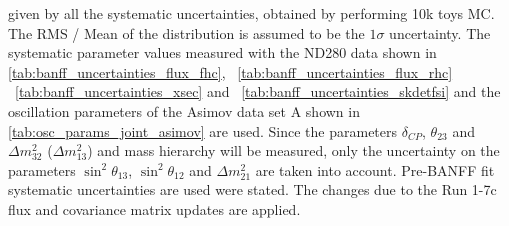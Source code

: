\begin{table}[htb]
{ given by all the systematic uncertainties, obtained by performing 10k toys MC.
The RMS / Mean of the distribution is assumed to be the $1\sigma$ uncertainty.
The systematic parameter values measured with the ND280 data 
shown in 
\cref{tab:banff_uncertainties_flux_fhc},
~\ref{tab:banff_uncertainties_flux_rhc}
~\ref{tab:banff_uncertainties_xsec}
and
~\ref{tab:banff_uncertainties_skdetfsi}
and the oscillation parameters of the Asimov data set A shown in \cref{tab:osc_params_joint_asimov}
are used.
Since the parameters $\delta_{CP}$, $\theta_{23}$ and $\Delta m^2_{32}$ ($\Delta m^2_{13}$) and mass hierarchy
will be measured,
only the uncertainty on the parameters 
$\sin^2 \theta_{13}$,
$\sin^2 \theta_{12}$
and 
$\Delta m^2_{21}$ 
are taken into account.
Pre-BANFF fit systematic uncertainties are used were stated.
The changes due to the Run 1-7c flux and covariance matrix updates are applied.
}                                                                                                                                                                                          
\label{tab:nsk_systematic_table_summary_joint_asimov_A_rhc_mulike_Run17c}
\end{table}




